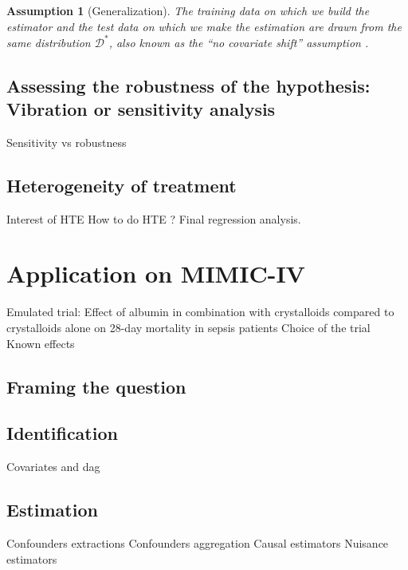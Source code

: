 \documentclass[french,12pt,twoside,a4paper]{book}
\newtheorem{assumption}{Assumption}
\begin{document}
\begin{background_box_left}
  \begin{assumption}[Generalization]\label{assumption:generalization} The training
    data on which we build the estimator and the test data on which we make the
    estimation are drawn from the same distribution $\mathcal D^*$, also known as
    the ``no covariate shift'' assumption \citep{jesson_identifying_2020}.
  \end{assumption}

\end{background_box_left}

\subsection{Assessing the robustness of the hypothesis: Vibration or sensitivity
  analysis}%
\label{subsec:causal_tuto:vibration_analysis}%

Sensitivity vs robustness

\subsection{Heterogeneity of treatment}\label{subsec:causal_tuto:heterogeneity}

Interest of HTE
How to do HTE ? Final regression analysis.

\section{Application on MIMIC-IV}\label{sec:causal_tuto:application}

Emulated trial: Effect of albumin in combination with crystalloids compared to crystalloids alone on 28-day mortality in sepsis patients
Choice of the trial
Known effects

\subsection{Framing the question}\label{subsec:causal_tuto:framing_mimic}

\subsection{Identification}
Covariates and dag

\subsection{Estimation}\label{subsec:causal_tuto:estimation_mimic}
Confounders extractions
Confounders aggregation
Causal estimators
Nuisance estimators
\end{document}
